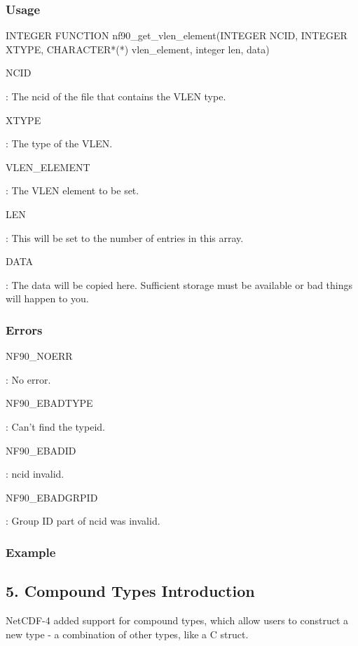 \subsubsection*{Usage}


\begin{DoxyCode}
\textcolor{keyword}{INTEGER }\textcolor{keyword}{FUNCTION }nf90\_get\_vlen\_element(INTEGER NCID, INTEGER XTYPE,
        CHARACTER*(*) vlen\_element, integer len, data)
\end{DoxyCode}


{\ttfamily N\+C\+ID}

\+: The ncid of the file that contains the V\+L\+EN type.

{\ttfamily X\+T\+Y\+PE}

\+: The type of the V\+L\+EN.

{\ttfamily V\+L\+E\+N\+\_\+\+E\+L\+E\+M\+E\+NT}

\+: The V\+L\+EN element to be set.

{\ttfamily L\+EN}

\+: This will be set to the number of entries in this array.

{\ttfamily D\+A\+TA}

\+: The data will be copied here. Sufficient storage must be available or bad things will happen to you.

\subsubsection*{Errors}

{\ttfamily N\+F90\+\_\+\+N\+O\+E\+RR}

\+: No error.

{\ttfamily N\+F90\+\_\+\+E\+B\+A\+D\+T\+Y\+PE}

\+: Can’t find the typeid.

{\ttfamily N\+F90\+\_\+\+E\+B\+A\+D\+ID}

\+: ncid invalid.

{\ttfamily N\+F90\+\_\+\+E\+B\+A\+D\+G\+R\+P\+ID}

\+: Group ID part of ncid was invalid.

\subsubsection*{Example}\hypertarget{f90-user-defined-data-types_f90-compound-types-introduction}{}\subsection{5. Compound Types Introduction }\label{f90-user-defined-data-types_f90-compound-types-introduction}
Net\+C\+D\+F-\/4 added support for compound types, which allow users to construct a new type -\/ a combination of other types, like a C struct.

